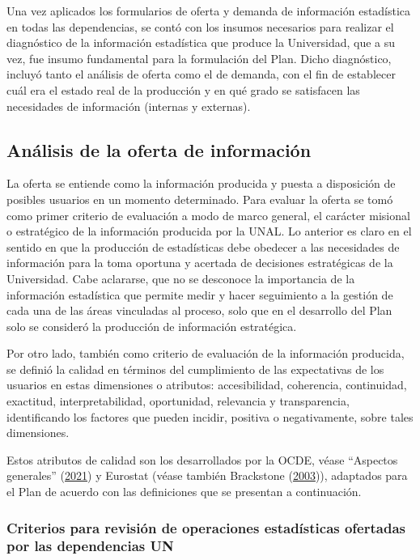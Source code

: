 \documentclass[
]{book}
\begin{document}
Una vez aplicados los formularios de oferta y demanda de información estadística en todas las
dependencias, se contó con los insumos necesarios para realizar el diagnóstico de la información
estadística que produce la Universidad, que a su vez, fue insumo fundamental para la formulación del
Plan. Dicho diagnóstico, incluyó tanto el análisis de oferta como el de demanda, con el fin de
establecer cuál era el estado real de la producción y en qué grado se satisfacen las necesidades de
información (internas y externas).

\hypertarget{anuxe1lisis-de-la-oferta-de-informaciuxf3n}{%
\subsection{Análisis de la oferta de información}\label{anuxe1lisis-de-la-oferta-de-informaciuxf3n}}

La oferta se entiende como la información producida y puesta a disposición de
posibles usuarios en un momento determinado. Para evaluar la oferta se tomó como primer
criterio de evaluación a modo de marco general, el carácter misional o estratégico de la
información producida por la UNAL. Lo anterior es claro en el sentido en que la producción de
estadísticas debe obedecer a las necesidades de información para la toma oportuna y acertada de
decisiones estratégicas de la Universidad. Cabe aclararse, que no se desconoce la importancia de la
información estadística que permite medir y hacer seguimiento a la gestión de cada una de las
áreas vinculadas al proceso, solo que en el desarrollo del Plan solo se consideró la producción de
información estratégica.

Por otro lado, también como criterio de evaluación de la información producida, se definió la
calidad en términos del cumplimiento de las expectativas de los usuarios en estas dimensiones o
atributos: accesibilidad, coherencia, continuidad, exactitud, interpretabilidad, oportunidad,
relevancia y transparencia, identificando los factores que pueden incidir, positiva o
negativamente, sobre tales dimensiones.

Estos atributos de calidad son los desarrollados por la OCDE, véase {``{Aspectos generales}''} (\protect\hyperlink{ref-BibEntry2021May}{2021}) y Eurostat (véase también Brackstone (\protect\hyperlink{ref-brackstone2003gestion}{2003})), adaptados para el Plan de acuerdo con las definiciones que se presentan a continuación.

\hypertarget{criterios-para-revisiuxf3n-de-operaciones-estaduxedsticas-ofertadas-por-las-dependencias-un}{%
\subsubsection{Criterios para revisión de operaciones estadísticas ofertadas por las dependencias UN}\label{criterios-para-revisiuxf3n-de-operaciones-estaduxedsticas-ofertadas-por-las-dependencias-un}}
\end{document}
